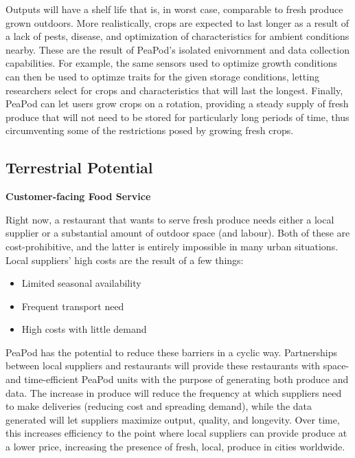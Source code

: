 \documentclass{report}
\begin{document}
Outputs will have a shelf life that is, in worst case, comparable to fresh produce grown outdoors. More realistically, crops are expected to last longer as a result of a lack of pests, disease, and optimization of characteristics for ambient conditions nearby. These are the result of PeaPod's isolated enivornment and data collection capabilities. For example, the same sensors used to optimize growth conditions can then be used to optimze traits for the given storage conditions, letting researchers select for crops and characteristics that will last the longest. Finally, PeaPod can let users grow crops on a rotation, providing a steady supply of fresh produce that will not need to be stored for particularly long periods of time, thus circumventing some of the restrictions posed by growing fresh crops.


\subsection{Terrestrial Potential}
\label{sec:terrestrial}




\textbf{Customer-facing Food Service} %

Right now, a restaurant that wants to serve fresh produce needs either a local supplier or a substantial amount of outdoor space (and labour). Both of these are cost-prohibitive, and the latter is entirely impossible in many urban situations. Local suppliers' high costs are the result of a few things:
\begin{itemize}
    \item Limited seasonal availability
    \item Frequent transport need
    \item High costs with little demand
\end{itemize}
PeaPod has the potential to reduce these barriers in a cyclic way. Partnerships between local suppliers and restaurants will provide these restaurants with space- and time-efficient PeaPod units with the purpose of generating both produce and data. The increase in produce will reduce the frequency at which suppliers need to make deliveries (reducing cost and spreading demand), while the data generated will let suppliers maximize output, quality, and longevity. Over time, this increases efficiency to the point where local suppliers can provide produce at a lower price, increasing the presence of fresh, local, produce in cities worldwide.
\end{document}
